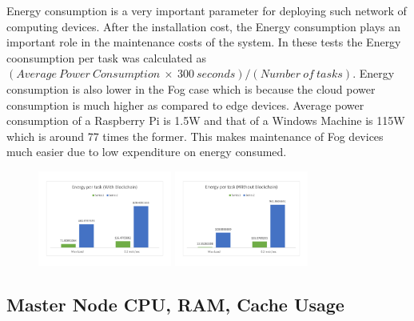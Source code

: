 \documentclass[10pt,journal,compsoc]{IEEEtran}
\begin{document}
Energy consumption is a very important parameter for deploying such network of computing devices. After the installation cost, the Energy consumption plays an important role in the maintenance costs of the system. In these tests the Energy coonsumption per task was calculated as $(Average\ Power\ Consumption\ \times\ 300\ seconds)/(Number\ of\ tasks)$. Energy consumption is also lower in the Fog case which is because the cloud power consumption is much higher as compared to edge devices. Average power consumption of a Raspberry Pi is 1.5W and that of a Windows Machine is 115W which is around 77 times the former. This makes maintenance of Fog devices much easier due to low expenditure on energy consumed. 
\begin{figure}[h]
\centering
\includegraphics[width=4.4cm]{g31}
\includegraphics[width=4.4cm]{g32}
\end{figure}

\subsection{Master Node CPU, RAM, Cache Usage}
\end{document}
